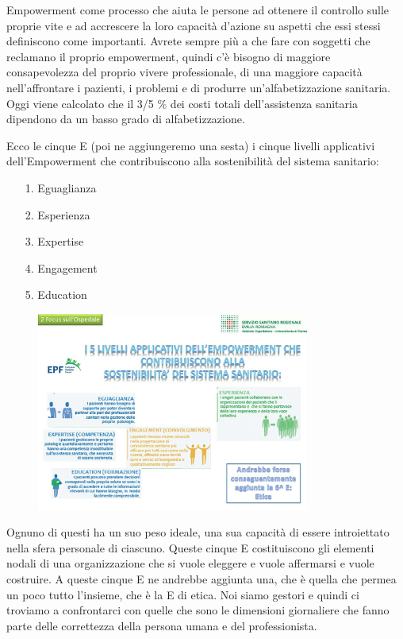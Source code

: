 Empowerment come processo che aiuta le persone ad ottenere il controllo
sulle proprie vite e ad accrescere la loro capacità d'azione su aspetti
che essi stessi definiscono come importanti. Avrete sempre più a che
fare con soggetti che reclamano il proprio empowerment, quindi c'è
bisogno di maggiore consapevolezza del proprio vivere professionale, di
una maggiore capacità nell'affrontare i pazienti, i problemi e di
produrre un'alfabetizzazione sanitaria. Oggi viene calcolato che il 3/5
\% dei costi totali dell'assistenza sanitaria dipendono da un basso
grado di alfabetizzazione.

Ecco le cinque E (poi ne aggiungeremo una sesta) i cinque livelli
applicativi dell'Empowerment che contribuiscono alla sostenibilità del
sistema sanitario:

\begin{itemize}
\item[1.]
  Eguaglianza
\item[2.]
  Esperienza
\item[3.]
  Expertise
\item[4.]
  Engagement
\item[5.]
  Education
\end{itemize}

 \begin{figure}[!ht]
\centering
	\includegraphics[width=0.8\textwidth]{32/image13.jpeg}
	\end{figure}

Ognuno di questi ha un suo peso ideale, una sua capacità di essere
introiettato nella sfera personale di ciascuno. Queste cinque E
costituiscono gli elementi nodali di una organizzazione che si vuole
eleggere e vuole affermarsi e vuole costruire. A queste cinque E ne
andrebbe aggiunta una, che è quella che permea un poco tutto l'insieme,
che è la E di etica. Noi siamo gestori e quindi ci troviamo a
confrontarci con quelle che sono le dimensioni giornaliere che fanno
parte delle correttezza della persona umana e del professionista.

